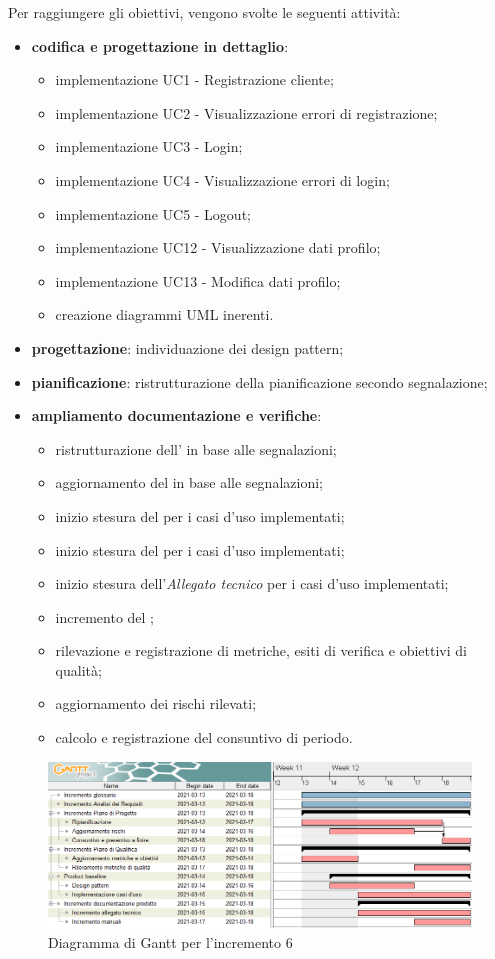 Per raggiungere gli obiettivi, vengono svolte le seguenti attività:
\begin{itemize}

\item \textbf{codifica e progettazione in dettaglio}:
\begin{itemize}
\item implementazione UC1 - Registrazione cliente;
\item implementazione UC2 - Visualizzazione errori di registrazione;
\item implementazione UC3 - Login;
\item implementazione UC4 - Visualizzazione errori di login;
\item implementazione UC5 - Logout;
\item implementazione UC12 - Visualizzazione dati profilo;
\item implementazione UC13 - Modifica dati profilo;
\item creazione diagrammi UML inerenti.

\end{itemize}

\item \textbf{progettazione}: individuazione dei design pattern;

\item \textbf{pianificazione}: ristrutturazione della pianificazione secondo segnalazione;

\item \textbf{ampliamento documentazione e verifiche}:
\begin{itemize}
\item ristrutturazione dell' in base alle segnalazioni;
\item aggiornamento del  in base alle segnalazioni;
\item inizio stesura del \textit{\MU{}} per i casi d'uso implementati;
\item inizio stesura del \textit{\MM{}} per i casi d'uso implementati;
\item inizio stesura dell'\textit{Allegato tecnico} per i casi d'uso implementati;
\item incremento del ;
\item rilevazione e registrazione di metriche, esiti di verifica e obiettivi di qualità;
\item aggiornamento dei rischi rilevati;
\item calcolo e registrazione del consuntivo di periodo.
\end{itemize}

\end{itemize}
\begin{figure}[H]
\centering

\centerline{\includegraphics[scale=0.6]{res/Pianificazione/Fasi/CodificaIncrementi/ganttIncremento6}}
\caption{Diagramma di Gantt per l'incremento 6}
\end{figure}